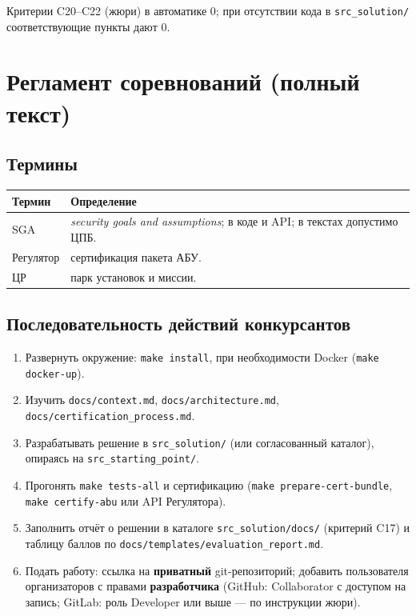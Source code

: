 \vspace{0.5em}
\noindent\small Критерии C20--C22 (жюри) в автоматике 0; при отсутствии кода в \texttt{src\_solution/} соответствующие пункты дают 0.

\chapter{Регламент соревнований (полный текст)}
\label{app:regulations}

\section*{Термины}

\begin{tabularx}{\textwidth}{@{}l X@{}}
\toprule
\textbf{Термин} & \textbf{Определение} \\
\midrule
SGA & \textit{security goals and assumptions}; в коде и API; в текстах допустимо ЦПБ. \\
Регулятор & сертификация пакета АБУ. \\
ЦР & парк установок и миссии. \\
\bottomrule
\end{tabularx}

\section*{Последовательность действий конкурсантов}

\begin{enumerate}
  \item Развернуть окружение: \texttt{make install}, при необходимости Docker (\texttt{make docker-up}).
  \item Изучить \texttt{docs/context.md}, \texttt{docs/architecture.md}, \texttt{docs/certification\_process.md}.
  \item Разрабатывать решение в \texttt{src\_solution/} (или согласованный каталог), опираясь на \texttt{src\_starting\_point/}.
  \item Прогонять \texttt{make tests-all} и сертификацию (\texttt{make prepare-cert-bundle}, \texttt{make certify-abu} или API Регулятора).
  \item Заполнить отчёт о решении в каталоге \texttt{src\_solution/docs/} (критерий C17) и таблицу баллов по \texttt{docs/templates/evaluation\_report.md}.
  \item Подать работу: ссылка на \textbf{приватный} git-репозиторий; добавить пользователя организаторов с правами \textbf{разработчика} (GitHub: Collaborator с доступом на запись; GitLab: роль Developer или выше --- по инструкции жюри).
\end{enumerate}

